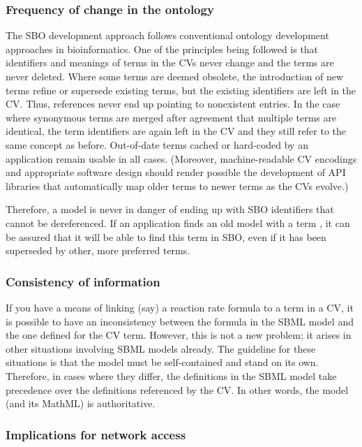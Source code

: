 \subsubsection{Frequency of change in the ontology}
\label{sec:sbo-frequency-of-change}

The SBO development approach follows conventional ontology
development approaches in bioinformatics.  One of the principles
being followed is that identifiers and meanings of terms in the
CVs never change and the terms are never deleted.  Where some
terms are deemed obsolete, the introduction of new terms refine or
supersede existing terms, but the existing identifiers are left in
the CV.  Thus, references never end up pointing to nonexistent
entries.  In the case where synonymous terms are merged after
agreement that multiple terms are identical, the term identifiers
are again left in the CV and they still refer to the same concept
as before.  Out-of-date terms cached or hard-coded by an
application remain usable in all cases.  (Moreover, machine-readable
CV encodings and appropriate software design should render
possible the development of API libraries that automatically map
older terms to newer terms as the CVs evolve.)

Therefore, a model is never in danger of ending up with SBO
identifiers that cannot be dereferenced.  If an application finds
an old model with a term , it can be assured
that it will be able to find this term in SBO, even if it has been
superseded by other, more preferred terms.

\subsubsection{Consistency of information}

If you have a means of linking (say) a reaction rate formula to a
term in a CV, it is possible to have an inconsistency between the
formula in the SBML model and the one defined for the CV term.
However, this is not a new problem; it arises in other situations
involving SBML models already.  The guideline for these situations
is that the model must be self-contained and stand on its own.
Therefore, in cases where they differ, the definitions in the SBML
model take precedence over the definitions referenced by the CV.
In other words, the model (and its MathML) is authoritative.


\subsubsection{Implications for network access}
\label{sec:sbo-implications-for-network-access}


